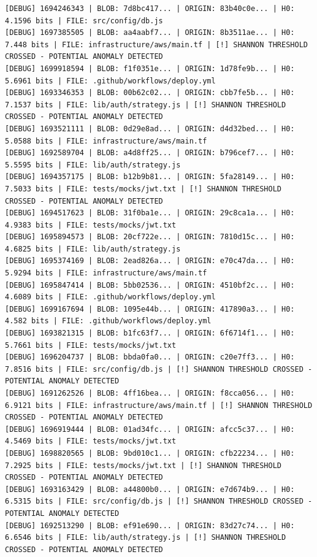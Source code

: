 \documentclass[12pt, a4paper, oneside]{report}
\begin{document}
\newpage
\begin{lstlisting}[basicstyle=\tiny\ttfamily]
[DEBUG] 1694246343 | BLOB: 7d8bc417... | ORIGIN: 83b40c0e... | H0: 4.1596 bits | FILE: src/config/db.js
[DEBUG] 1697385505 | BLOB: aa4aabf7... | ORIGIN: 8b3511ae... | H0: 7.448 bits | FILE: infrastructure/aws/main.tf | [!] SHANNON THRESHOLD CROSSED - POTENTIAL ANOMALY DETECTED
[DEBUG] 1699918594 | BLOB: f1f0351e... | ORIGIN: 1d78fe9b... | H0: 5.6961 bits | FILE: .github/workflows/deploy.yml
[DEBUG] 1693346353 | BLOB: 00b62c02... | ORIGIN: cbb7fe5b... | H0: 7.1537 bits | FILE: lib/auth/strategy.js | [!] SHANNON THRESHOLD CROSSED - POTENTIAL ANOMALY DETECTED
[DEBUG] 1693521111 | BLOB: 0d29e8ad... | ORIGIN: d4d32bed... | H0: 5.0588 bits | FILE: infrastructure/aws/main.tf
[DEBUG] 1692589704 | BLOB: a4d8ff25... | ORIGIN: b796cef7... | H0: 5.5595 bits | FILE: lib/auth/strategy.js
[DEBUG] 1694357175 | BLOB: b12b9b81... | ORIGIN: 5fa28149... | H0: 7.5033 bits | FILE: tests/mocks/jwt.txt | [!] SHANNON THRESHOLD CROSSED - POTENTIAL ANOMALY DETECTED
[DEBUG] 1694517623 | BLOB: 31f0ba1e... | ORIGIN: 29c8ca1a... | H0: 4.9383 bits | FILE: tests/mocks/jwt.txt
[DEBUG] 1695894573 | BLOB: 20cf722e... | ORIGIN: 7810d15c... | H0: 4.6825 bits | FILE: lib/auth/strategy.js
[DEBUG] 1695374169 | BLOB: 2ead826a... | ORIGIN: e70c47da... | H0: 5.9294 bits | FILE: infrastructure/aws/main.tf
[DEBUG] 1695847414 | BLOB: 5bb02536... | ORIGIN: 4510bf2c... | H0: 4.6089 bits | FILE: .github/workflows/deploy.yml
[DEBUG] 1699167694 | BLOB: 1095e44b... | ORIGIN: 417890a3... | H0: 4.582 bits | FILE: .github/workflows/deploy.yml
[DEBUG] 1693821315 | BLOB: b1fc63f7... | ORIGIN: 6f6714f1... | H0: 5.7661 bits | FILE: tests/mocks/jwt.txt
[DEBUG] 1696204737 | BLOB: bbda0fa0... | ORIGIN: c20e7ff3... | H0: 7.8516 bits | FILE: src/config/db.js | [!] SHANNON THRESHOLD CROSSED - POTENTIAL ANOMALY DETECTED
[DEBUG] 1691262526 | BLOB: 4ff16bea... | ORIGIN: f8cca056... | H0: 6.9121 bits | FILE: infrastructure/aws/main.tf | [!] SHANNON THRESHOLD CROSSED - POTENTIAL ANOMALY DETECTED
[DEBUG] 1696919444 | BLOB: 01ad34fc... | ORIGIN: afcc5c37... | H0: 4.5469 bits | FILE: tests/mocks/jwt.txt
[DEBUG] 1698820565 | BLOB: 9bd010c1... | ORIGIN: cfb22234... | H0: 7.2925 bits | FILE: tests/mocks/jwt.txt | [!] SHANNON THRESHOLD CROSSED - POTENTIAL ANOMALY DETECTED
[DEBUG] 1693163429 | BLOB: a44800b0... | ORIGIN: e7d674b9... | H0: 6.5315 bits | FILE: src/config/db.js | [!] SHANNON THRESHOLD CROSSED - POTENTIAL ANOMALY DETECTED
[DEBUG] 1692513290 | BLOB: ef91e690... | ORIGIN: 83d27c74... | H0: 6.6546 bits | FILE: lib/auth/strategy.js | [!] SHANNON THRESHOLD CROSSED - POTENTIAL ANOMALY DETECTED

\end{lstlisting}
\end{document}
